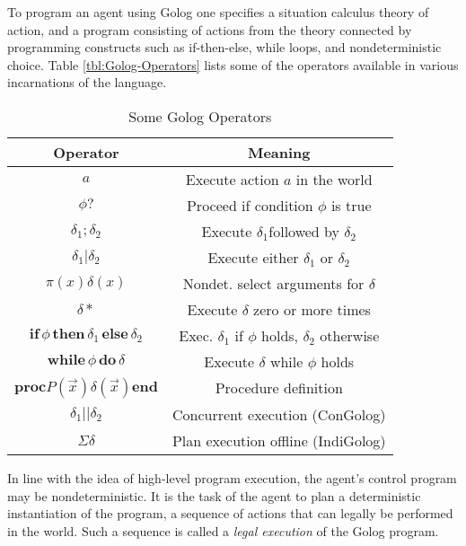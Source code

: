 To program an agent using Golog one specifies a situation calculus
theory of action, and a program consisting of actions from the theory
connected by programming constructs such as if-then-else, while loops,
and nondeterministic choice. Table \ref{tbl:Golog-Operators} lists
some of the operators available in various incarnations of the language.%
\begin{table}
\begin{centering}
\begin{tabular}{|c|c|}
\hline 
Operator  & Meaning\tabularnewline
\hline
\hline 
$a$  & Execute action $a$ in the world\tabularnewline
\hline 
$\phi?$  & Proceed if condition $\phi$ is true\tabularnewline
\hline 
$\delta_{1};\delta_{2}$  & Execute $\delta_{1}$followed by $\delta_{2}$\tabularnewline
\hline 
$\delta_{1}|\delta_{2}$  & Execute either $\delta_{1}$ or $\delta_{2}$\tabularnewline
\hline 
$\pi(x)\delta(x)$  & Nondet. select arguments for $\delta$\tabularnewline
\hline 
$\delta*$  & Execute $\delta$ zero or more times\tabularnewline
\hline 
$\mathbf{if}\,\phi\,\mathbf{then}\,\delta_{1}\,\mathbf{else}\,\delta_{2}$  & Exec. $\delta_{1}$ if $\phi$ holds, $\delta_{2}$ otherwise\tabularnewline
\hline 
$\mathbf{while\,}\phi\mathbf{\, do}\,\delta$  & Execute $\delta$ while $\phi$ holds\tabularnewline
\hline 
$\mathbf{proc}P(\overrightarrow{x})\delta(\overrightarrow{x})\mathbf{end}$  & Procedure definition\tabularnewline
\hline 
$\delta_{1}||\delta_{2}$  & Concurrent execution (ConGolog)\tabularnewline
\hline 
$\Sigma\delta$  & Plan execution offline (IndiGolog)\tabularnewline
\hline
\end{tabular}
\par\end{centering}

\caption{ Some Golog Operators\label{tbl:Background:Golog-Operators} }

\end{table}


In line with the idea of high-level program execution, the agent's
control program may be nondeterministic. It is the task of the agent
to plan a deterministic instantiation of the program, a sequence of
actions that can legally be performed in the world. Such a sequence
is called a \emph{legal execution} of the Golog program.

